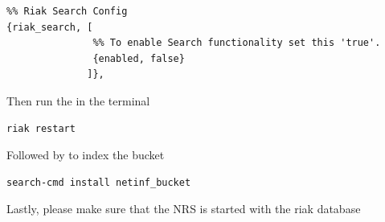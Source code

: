\begin{verbatim}
%% Riak Search Config
{riak_search, [
               %% To enable Search functionality set this 'true'.
               {enabled, false}
              ]},
\end{verbatim}

Then run the in the terminal

\begin{verbatim}
riak restart
\end{verbatim}

Followed by to index the bucket

\begin{verbatim}
search-cmd install netinf_bucket
\end{verbatim}

Lastly, please make sure that the NRS is started with the riak database


